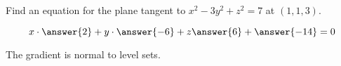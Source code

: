 \documentclass{ximera}
\author{David Guichard \and Neal Koblitz \and H. Jerome Keisler \and Albert Scheller \and Barry Balof \and Mike Wills \and Matthew Carr \and Bart Snapp}
\begin{document}
\begin{exercise}
Find an equation for the plane tangent to $x^2-3y^2+z^2=7$ at $(1,1,3)$.

\begin{prompt}
\[
x\cdot \answer{2} + y\cdot \answer{-6} + z\answer{6} + \answer{-14}=0
\]
\end{prompt}
\begin{hint}
  The gradient is normal to level sets.
\end{hint}

\end{exercise}
\end{document}
